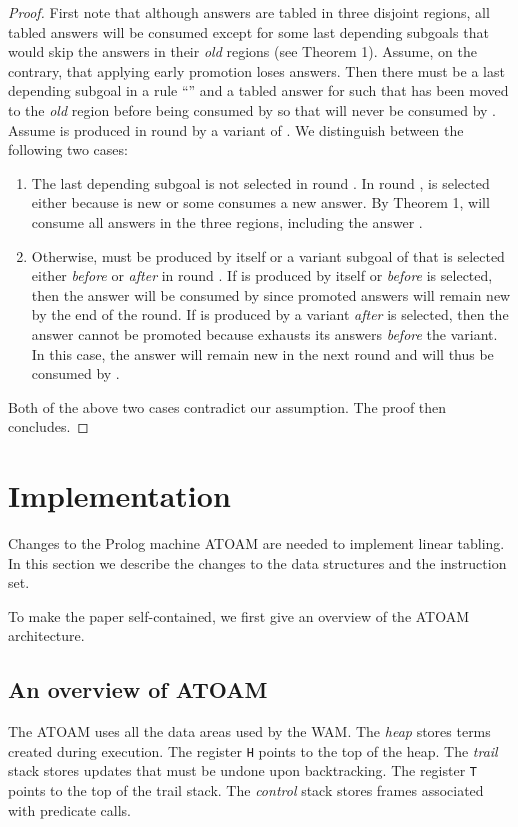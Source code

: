 \documentclass{tlp}
\newcommand{\ignore}[1]{}
\begin{document}
\begin{proof}
First note that although answers are tabled in three disjoint regions, all tabled answers will be consumed except for some last depending subgoals that would skip the answers in their {\it old} regions (see Theorem 1). Assume, on the contrary, that applying early promotion loses answers. Then there must be a last depending subgoal  in a rule ``'' and a tabled answer  for  such that  has been moved to the {\it old} region before being consumed by  so that  will never be consumed by . Assume  is produced in round  by a variant of . We distinguish between the following two cases:

\begin{enumerate}
\item The last depending subgoal  is not selected in round . In round ,  is selected either because  is new or some  consumes a new answer. By Theorem 1,  will consume all answers in the three regions, including the answer .

\item Otherwise,  must be produced by  itself or a variant subgoal of  that is selected either {\it before} or {\it after}  in round . If  is produced by  itself or {\it before}  is selected, then the answer will be consumed by  since promoted answers will remain new by the end of the round. If  is produced by a variant {\it after}  is selected, then the answer cannot be promoted because  exhausts its answers {\it before} the variant. In this case, the answer  will remain new in the next round and will thus be consumed by .
\end{enumerate}

Both of the above two cases contradict our assumption. The proof then concludes.
\end{proof}

\section{Implementation}
Changes to the Prolog machine ATOAM \cite{Zhou96}  are needed to implement linear tabling. In this section we describe the changes to the data structures and the instruction set. 
\ignore{We also show how to implement the cut operator. }
To make the paper self-contained, we first give an overview of the ATOAM architecture. 

\subsection{An overview of ATOAM}
The ATOAM uses all the data areas used by the WAM. The {\it heap} stores terms created during execution. The register {\tt H} points to the top of the heap. The {\it trail} stack stores updates that must be undone upon backtracking. The register {\tt T} points to the top of the trail stack. The {\it control} stack stores frames associated with predicate calls. 
\end{document}
